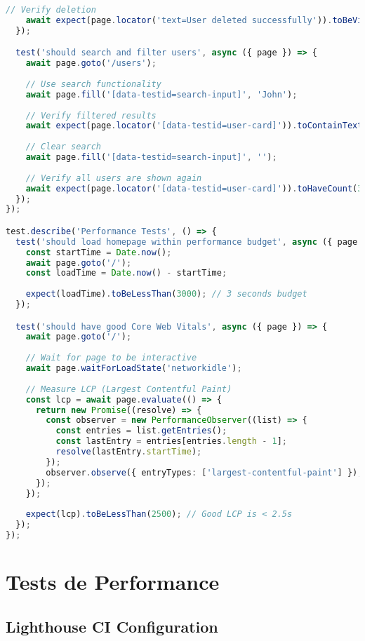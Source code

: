 \begin{lstlisting}[language=TypeScript, caption=Tests E2E]
    // Verify deletion
    await expect(page.locator('text=User deleted successfully')).toBeVisible();
  });

  test('should search and filter users', async ({ page }) => {
    await page.goto('/users');
    
    // Use search functionality
    await page.fill('[data-testid=search-input]', 'John');
    
    // Verify filtered results
    await expect(page.locator('[data-testid=user-card]')).toContainText('John');
    
    // Clear search
    await page.fill('[data-testid=search-input]', '');
    
    // Verify all users are shown again
    await expect(page.locator('[data-testid=user-card]')).toHaveCount(3, { timeout: 5000 });
  });
});

test.describe('Performance Tests', () => {
  test('should load homepage within performance budget', async ({ page }) => {
    const startTime = Date.now();
    await page.goto('/');
    const loadTime = Date.now() - startTime;
    
    expect(loadTime).toBeLessThan(3000); // 3 seconds budget
  });

  test('should have good Core Web Vitals', async ({ page }) => {
    await page.goto('/');
    
    // Wait for page to be interactive
    await page.waitForLoadState('networkidle');
    
    // Measure LCP (Largest Contentful Paint)
    const lcp = await page.evaluate(() => {
      return new Promise((resolve) => {
        const observer = new PerformanceObserver((list) => {
          const entries = list.getEntries();
          const lastEntry = entries[entries.length - 1];
          resolve(lastEntry.startTime);
        });
        observer.observe({ entryTypes: ['largest-contentful-paint'] });
      });
    });
    
    expect(lcp).toBeLessThan(2500); // Good LCP is < 2.5s
  });
});
\end{lstlisting}

\section{Tests de Performance}

\subsection{Lighthouse CI Configuration}

